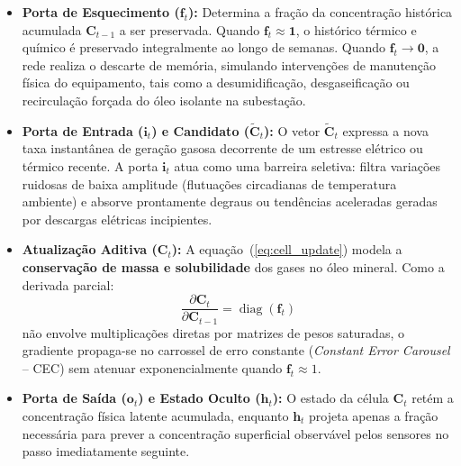 \documentclass[11pt,a4paper]{article}
\begin{document}
\begin{itemize}
  \item \textbf{Porta de Esquecimento ($\mathbf{f}_t$):} Determina a fração da concentração histórica acumulada $\mathbf{C}_{t-1}$ a ser preservada. Quando $\mathbf{f}_t \approx \mathbf{1}$, o histórico térmico e químico é preservado integralmente ao longo de semanas. Quando $\mathbf{f}_t \to \mathbf{0}$, a rede realiza o descarte de memória, simulando intervenções de manutenção física do equipamento, tais como a desumidificação, desgaseificação ou recirculação forçada do óleo isolante na subestação.
  \item \textbf{Porta de Entrada ($\mathbf{i}_t$) e Candidato ($\tilde{\mathbf{C}}_t$):} O vetor $\tilde{\mathbf{C}}_t$ expressa a nova taxa instantânea de geração gasosa decorrente de um estresse elétrico ou térmico recente. A porta $\mathbf{i}_t$ atua como uma barreira seletiva: filtra variações ruidosas de baixa amplitude (flutuações circadianas de temperatura ambiente) e absorve prontamente degraus ou tendências aceleradas geradas por descargas elétricas incipientes.
  \item \textbf{Atualização Aditiva ($\mathbf{C}_t$):} A equação~(\ref{eq:cell_update}) modela a \textbf{conservação de massa e solubilidade} dos gases no óleo mineral. Como a derivada parcial:
  \begin{equation}
    \frac{\partial \mathbf{C}_t}{\partial \mathbf{C}_{t-1}} = \operatorname{diag}(\mathbf{f}_t)
  \end{equation}
  não envolve multiplicações diretas por matrizes de pesos saturadas, o gradiente propaga-se no carrossel de erro constante (\textit{Constant Error Carousel} -- CEC) sem atenuar exponencialmente quando $\mathbf{f}_t \approx 1$.
  \item \textbf{Porta de Saída ($\mathbf{o}_t$) e Estado Oculto ($\mathbf{h}_t$):} O estado da célula $\mathbf{C}_t$ retém a concentração física latente acumulada, enquanto $\mathbf{h}_t$ projeta apenas a fração necessária para prever a concentração superficial observável pelos sensores no passo imediatamente seguinte.
\end{itemize}
\end{document}
